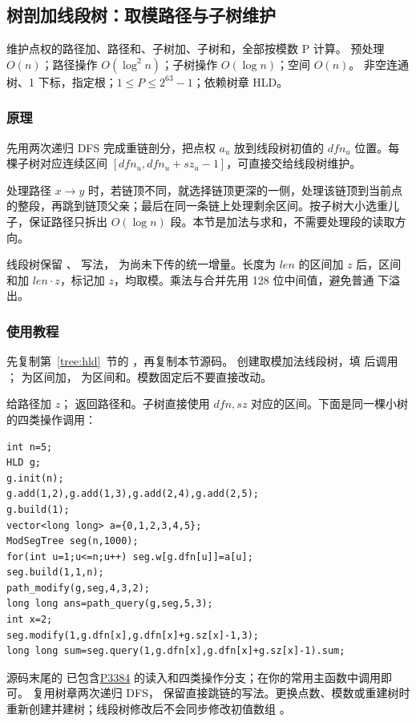 \subsection{树剖加线段树：取模路径与子树维护}
\label{ds:hld-segment}
\AlgorithmInfo
    {维护点权的路径加、路径和、子树加、子树和，全部按模数 P 计算。}
    {预处理 $O(n)$；路径操作 $O(\log^2 n)$；子树操作 $O(\log n)$；空间 $O(n)$。}
    {非空连通树、1 下标，指定根；$1\le P\le2^{63}-1$；依赖树章 HLD。}
\subsubsection*{原理}
先用两次递归 DFS 完成重链剖分，把点权 $a_u$ 放到线段树初值的 $dfn_u$ 位置。每棵子树对应连续区间 $[dfn_u,dfn_u+sz_u-1]$，可直接交给线段树维护。

处理路径 $x\to y$ 时，若链顶不同，就选择链顶更深的一侧，处理该链顶到当前点的整段，再跳到链顶父亲；最后在同一条链上处理剩余区间。按子树大小选重儿子，保证路径只拆出 $O(\log n)$ 段。本节是加法与求和，不需要处理段的读取方向。

线段树保留 、 写法， 为尚未下传的统一增量。长度为 $len$ 的区间加 $z$ 后，区间和加 $len\cdot z$，标记加 $z$，均取模。乘法与合并先用 128 位中间值，避免普通  下溢出。

\subsubsection*{使用教程}
先复制第~\ref{tree:hld}~节的 ，再复制本节源码。 创建取模加法线段树，填  后调用 ； 为区间加， 为区间和。模数固定后不要直接改动。

 给路径加 $z$； 返回路径和。子树直接使用 $dfn,sz$ 对应的区间。下面是同一棵小树的四类操作调用：
\begin{lstlisting}[style=mtycpp,numbers=none]
int n=5;
HLD g;
g.init(n);
g.add(1,2),g.add(1,3),g.add(2,4),g.add(2,5);
g.build(1);
vector<long long> a={0,1,2,3,4,5};
ModSegTree seg(n,1000);
for(int u=1;u<=n;u++) seg.w[g.dfn[u]]=a[u];
seg.build(1,1,n);
path_modify(g,seg,4,3,2);
long long ans=path_query(g,seg,5,3);
int x=2;
seg.modify(1,g.dfn[x],g.dfn[x]+g.sz[x]-1,3);
long long sum=seg.query(1,g.dfn[x],g.dfn[x]+g.sz[x]-1).sum;
\end{lstlisting}
源码末尾的  已包含\href{https://www.luogu.com.cn/problem/P3384}{P3384} 的读入和四类操作分支；在你的常用主函数中调用即可。 复用树章两次递归 DFS， 保留直接跳链的写法。更换点数、模数或重建树时重新创建并建树；线段树修改后不会同步修改初值数组 。
